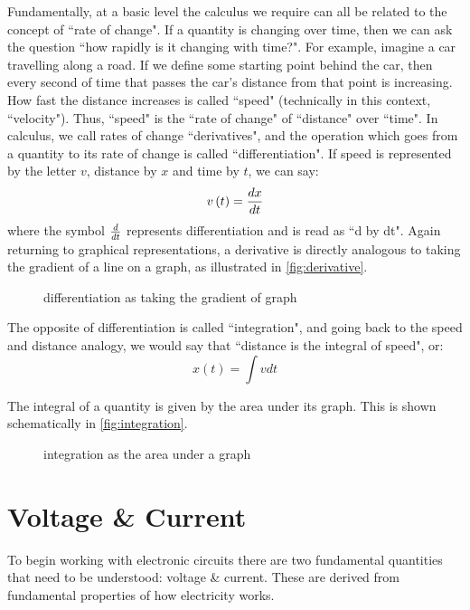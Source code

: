 \documentclass{memoir}
\begin{document}
	Fundamentally, at a basic level the calculus we require can all be related to the concept of ``rate of change". If a quantity is changing over time, then we can ask the question ``how rapidly is it changing with time?". For example, imagine a car travelling along a road. If we define some starting point behind the car, then every second of time that passes the car's distance from that point is increasing. How fast the distance increases is called ``speed" (technically in this context, ``velocity"). Thus, ``speed" is the ``rate of change" of ``distance" over ``time". In calculus, we call rates of change ``derivatives", and the operation which goes from a quantity to its rate of change is called ``differentiation". If speed is represented by the letter $v$, distance by $x$ and time by $t$, we can say:
	\begin{equation}
		v\left(t\right) = {d x \over dt}
	\end{equation}
	where the symbol $d \over dt$ represents differentiation and is read as ``d by dt". Again returning to graphical representations, a derivative is directly analogous to taking the gradient of a line on a graph, as illustrated in \autoref{fig:derivative}.
	
	\begin{figure}
		\caption{\label{fig:derivative} differentiation as taking the gradient of graph}
	\end{figure}

	The opposite of differentiation is called ``integration", and going back to the speed and distance analogy, we would say that ``distance is the integral of speed", or:
	\begin{equation}
		x\left(t\right) = \int v dt
	\end{equation}
	
	The integral of a quantity is given by the area under its graph. This is shown schematically in  \autoref{fig:integration}.

	\begin{figure}	
		\caption{\label{fig:integration} integration as the area under a graph}
	\end{figure}

	\section{Voltage \& Current \label{voltage_current}}
	To begin working with electronic circuits there are two fundamental quantities that need to be understood: voltage \& current. These are derived from fundamental properties of how electricity works.
	
\end{document}
